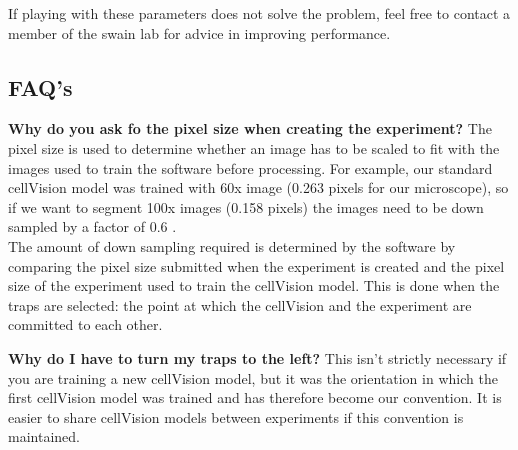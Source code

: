 If playing with these parameters does not solve the problem, feel free to contact a member of the swain lab for advice in improving performance.

\subsection{FAQ's}

\textbf{Why do you ask fo the pixel size when creating the experiment?}
The pixel size is used to determine whether an image has to be scaled to fit with the images used to train the software before processing. For example, our standard cellVision model was trained with 60x image (0.263 \microm pixels for our microscope), so if we want to segment 100x images (0.158 \microm pixels) the images need to be down sampled by a factor of $0.6$ .\\
The amount of down sampling required is determined by the software by comparing the pixel size submitted when the experiment is created and the pixel size of the experiment used to train the cellVision model. This is done when the traps are selected: the point at which the cellVision and the experiment are committed to each other.

\textbf{Why do I have to turn my traps to the left?}
This isn't strictly necessary if you are training a new cellVision model, but it was the orientation in which the first cellVision model was trained and has therefore become our convention. It is easier to share cellVision models between experiments if this convention is maintained.

